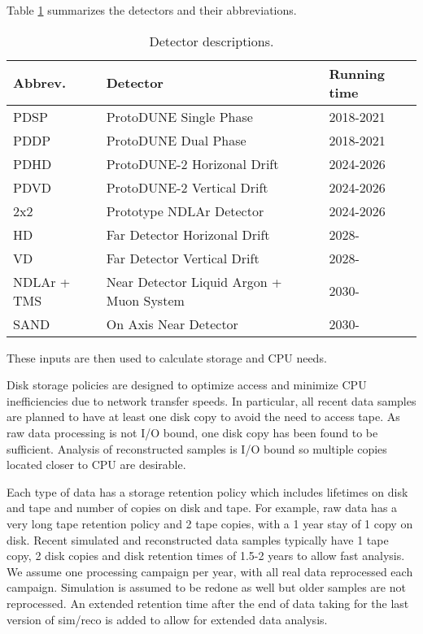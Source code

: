\documentclass[12pt]{article}
\begin{document}
 Table \ref{tab:detectors} summarizes the detectors and their abbreviations. 

\begin{table}[h]
\begin{centering}
  \begin{tabular}{|l|l|l|}
     \hline
    Abbrev. & Detector & Running time\\
    \hline
    PDSP & ProtoDUNE Single Phase & 2018-2021\\
    PDDP & ProtoDUNE Dual Phase & 2018-2021\\
    PDHD & ProtoDUNE-2 Horizonal Drift & 2024-2026\\
    PDVD & ProtoDUNE-2 Vertical Drift & 2024-2026\\
    2x2& Prototype NDLAr Detector & 2024-2026\\
    HD & Far Detector Horizonal Drift & 2028-\\
    VD & Far Detector Vertical Drift & 2028-\\
    NDLAr + TMS & Near Detector Liquid Argon + Muon System & 2030-\\
    SAND & On Axis Near Detector & 2030- \\
     \hline
     \end{tabular}
       \caption{Detector descriptions.}\label{tab:detectors}
  \end{centering}
   
     \end{table}


These inputs are then used to calculate storage and CPU needs. 

Disk storage policies are designed to optimize access and minimize CPU inefficiencies due to network transfer speeds.  In particular, all recent data samples are planned to have at least one disk copy to avoid the need to access tape.  As raw data processing is not I/O bound, one disk copy has been found to be sufficient.  Analysis of reconstructed samples is I/O bound so multiple copies located closer to CPU are desirable. 

Each type of data has a storage retention policy which includes lifetimes on disk and tape and number of copies on disk and tape.  For example, raw data has a very long tape retention policy and 2 tape copies, with a 1 year stay of 1 copy on disk.   Recent simulated and reconstructed data samples typically have 1 tape copy, 2 disk copies and disk retention times of 1.5-2 years to allow fast analysis.   We assume one processing campaign per year, with all real data reprocessed each campaign.   Simulation is assumed to be redone as well but older samples are not reprocessed.  An extended retention time after the end of data taking for the last version of sim/reco is added to allow for extended data analysis. 
\end{document}
